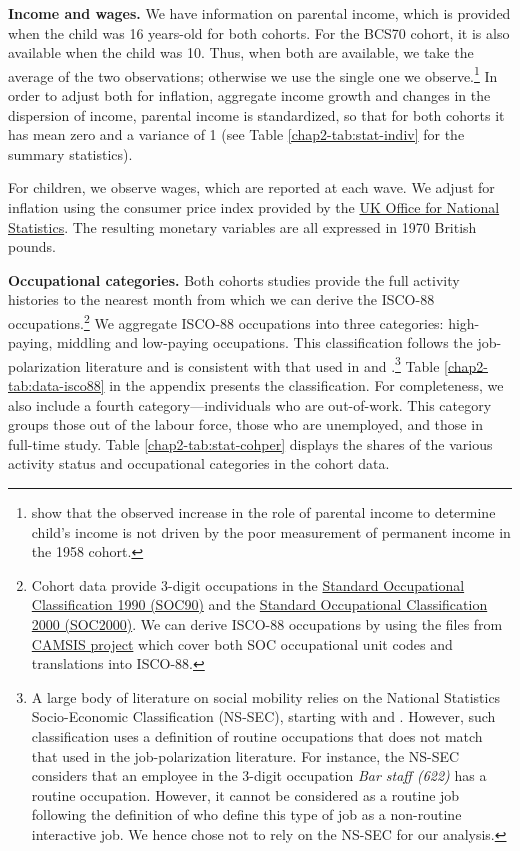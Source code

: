\textbf{Income and wages.} We have information on parental income, which is provided when the child was 16 years-old for both cohorts. For the BCS70 cohort, it is also available when the child was 10. Thus, when both are available, we take the average of the two observations; otherwise we use the single one we observe.\footnote{\cite{Blanden2013Intergenerational} show that the observed increase in the role of parental income to determine child's income is not driven by the poor measurement of permanent income in the 1958 cohort.} In order to adjust both for inflation, aggregate income growth and changes in the dispersion of income, parental income is standardized, so that for both cohorts it has mean zero and a variance of 1 (see Table \ref{chap2-tab:stat-indiv} for the summary statistics).

For children, we observe wages, which are reported at each wave. We adjust for inflation using the consumer price index provided by the \href{https://www.ons.gov.uk/economy/inflationandpriceindices}{UK Office for National Statistics}. The resulting monetary variables are all expressed in 1970 British pounds. 

\textbf{Occupational categories.} Both cohorts studies provide the full activity histories to the nearest month from which we can derive the ISCO-88 occupations.\footnote{Cohort data provide 3-digit occupations in the \href{https://www.hesa.ac.uk/support/documentation/occupational/soc90}{Standard Occupational Classification 1990 (SOC90)} and the \href{https://www.hesa.ac.uk/support/documentation/occupational/soc2000}{Standard Occupational Classification 2000 (SOC2000)}. We can derive ISCO-88 occupations by using the files from \href{http://www.camsis.stir.ac.uk/occunits/distribution.html}{CAMSIS project} which cover both SOC occupational unit codes and translations into ISCO-88.}
We aggregate ISCO-88 occupations into three categories: high-paying, middling and low-paying occupations. This classification follows the job-polarization literature and is consistent with that used in \cite{Goos2014Explaining} and \cite{Mahutga2018Job}.\footnote{A large body of literature on social mobility relies on the National Statistics Socio-Economic Classification (NS-SEC), starting with \cite{Erikson1992Constant} and \cite{Rose1998ESRC}. However, such classification uses a definition of routine occupations that does not match that used in the job-polarization literature. For instance, the NS-SEC considers that an employee in the 3-digit occupation \textit{Bar staff (622)} has a routine occupation. However, it cannot be considered as a routine job following the definition of \cite{Autor2003Skill} who define this type of job as a non-routine interactive job. We hence chose not to rely on the NS-SEC for our analysis.} Table \ref{chap2-tab:data-isco88} in the appendix presents the classification.  For completeness, we also include a fourth category---individuals who are out-of-work. This category groups those out of the labour force, those who are unemployed, and those in full-time study. Table \ref{chap2-tab:stat-cohper} displays the shares of the various activity status and occupational categories in the cohort data.

